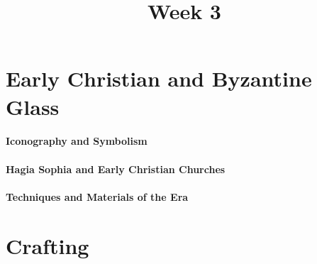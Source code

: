 \documentclass[11pt]{article}
\title{Week 3}
\date{}
\begin{document}
    \maketitle

    \section*{Early Christian and Byzantine Glass}
        \paragraph{Iconography and Symbolism}
    
        \paragraph{Hagia Sophia and Early Christian Churches}
    
        \paragraph{Techniques and Materials of the Era}

    \section*{Crafting}
        \begin{itemize}
        \end{itemize}
\end{document}
